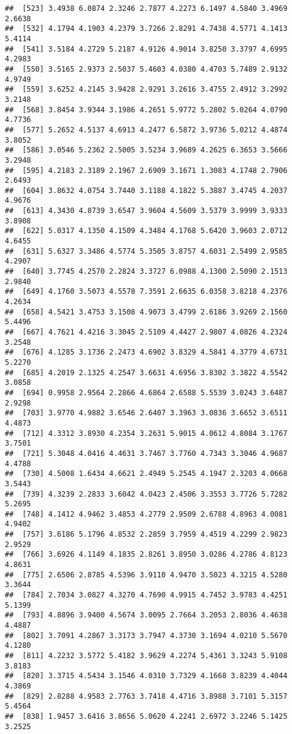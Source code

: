 \documentclass[12pt,a4paper]{scrartcl}\usepackage[]{graphicx}\usepackage[]{color}
\makeatletter
\newenvironment{kframe}{%
 \def\at@end@of@kframe{}%
 \ifinner\ifhmode%
  \def\at@end@of@kframe{\end{minipage}}%
  \begin{minipage}{\columnwidth}%
 \fi\fi%
 \def\FrameCommand##1{\hskip\@totalleftmargin \hskip-\fboxsep
 \colorbox{shadecolor}{##1}\hskip-\fboxsep
     \hskip-\linewidth \hskip-\@totalleftmargin \hskip\columnwidth}%
 \MakeFramed {\advance\hsize-\width
   \@totalleftmargin\z@ \linewidth\hsize
   \@setminipage}}%
 {\par\unskip\endMakeFramed%
 \at@end@of@kframe}
\newenvironment{knitrout}{}{} %
\makeatother
\begin{document}
\begin{Exercise}[difficulty=1, title={Understand the \texttt{<<-}}]
\begin{knitrout}
\begin{kframe}
\begin{verbatim}
##  [523] 3.4938 6.0874 2.3246 2.7877 4.2273 6.1497 4.5840 3.4969 2.6638
##  [532] 4.1794 4.1903 4.2379 3.7266 2.8291 4.7438 4.5771 4.1413 5.4114
##  [541] 3.5184 4.2729 5.2187 4.9126 4.9014 3.8250 3.3797 4.6995 4.2983
##  [550] 3.5165 2.9373 2.5037 5.4603 4.0380 4.4703 5.7489 2.9132 4.9749
##  [559] 3.6252 4.2145 3.9428 2.9291 3.2616 3.4755 2.4912 3.2992 3.2148
##  [568] 3.8454 3.9344 3.1986 4.2651 5.9772 5.2802 5.0264 4.0790 4.7736
##  [577] 5.2652 4.5137 4.6913 4.2477 6.5872 3.9736 5.0212 4.4874 3.8052
##  [586] 3.0546 5.2362 2.5005 3.5234 3.9689 4.2625 6.3653 3.5666 3.2948
##  [595] 4.2183 2.3189 2.1967 2.6909 3.1671 1.3083 4.1748 2.7906 2.6493
##  [604] 3.8632 4.0754 3.7440 3.1188 4.1822 5.3887 3.4745 4.2037 4.9676
##  [613] 4.3430 4.8739 3.6547 3.9604 4.5609 3.5379 3.9999 3.9333 3.8908
##  [622] 5.0317 4.1350 4.1509 4.3484 4.1768 5.6420 3.9603 2.0712 4.6455
##  [631] 5.6327 3.3486 4.5774 5.3505 3.8757 4.6031 2.5499 2.9585 4.2907
##  [640] 3.7745 4.2570 2.2824 3.3727 6.0988 4.1300 2.5090 2.1513 2.9840
##  [649] 4.1760 3.5073 4.5578 7.3591 2.6635 6.0358 3.8218 4.2376 4.2634
##  [658] 4.5421 3.4753 3.1508 4.9073 3.4799 2.6186 3.9269 2.1560 5.4496
##  [667] 4.7621 4.4216 3.3045 2.5109 4.4427 2.9807 4.0826 4.2324 3.2548
##  [676] 4.1285 3.1736 2.2473 4.6902 3.8329 4.5841 4.3779 4.6731 5.2270
##  [685] 4.2019 2.1325 4.2547 3.6631 4.6956 3.8302 3.3822 4.5542 3.0858
##  [694] 0.9958 2.9564 2.2866 4.6864 2.6588 5.5539 3.0243 3.6487 2.9298
##  [703] 3.9770 4.9882 3.6546 2.6407 3.3963 3.0836 3.6652 3.6511 4.4873
##  [712] 4.3312 3.8930 4.2354 3.2631 5.9015 4.0612 4.8084 3.1767 3.7501
##  [721] 5.3048 4.0416 4.4631 3.7467 3.7760 4.7343 3.3046 4.9687 4.4788
##  [730] 4.5008 1.6434 4.6621 2.4949 5.2545 4.1947 2.3203 4.0668 3.5443
##  [739] 4.3239 2.2833 3.6042 4.0423 2.4506 3.3553 3.7726 5.7282 5.2695
##  [748] 4.1412 4.9462 3.4853 4.2779 2.9509 2.6788 4.8963 4.0081 4.9402
##  [757] 3.6186 5.1796 4.8532 2.2859 3.7959 4.4519 4.2299 2.9823 2.9529
##  [766] 3.6926 4.1149 4.1835 2.8261 3.8950 3.0286 4.2786 4.8123 4.8631
##  [775] 2.6506 2.8785 4.5396 3.9110 4.9470 3.5023 4.3215 4.5280 3.3644
##  [784] 2.7034 3.0827 4.3270 4.7690 4.9915 4.7452 3.9783 4.4251 5.1399
##  [793] 4.8896 3.9400 4.5674 3.0095 2.7664 3.2053 2.8036 4.4638 4.4887
##  [802] 3.7091 4.2867 3.3173 3.7947 4.3730 3.1694 4.0210 5.5670 4.1280
##  [811] 4.2232 3.5772 5.4182 3.9629 4.2274 5.4361 3.3243 5.9108 3.8183
##  [820] 3.3715 4.5434 3.1546 4.0310 3.7329 4.1668 3.8239 4.4044 4.3869
##  [829] 2.8288 4.9583 2.7763 3.7418 4.4716 3.8988 3.7101 5.3157 5.4564
##  [838] 1.9457 3.6416 3.8656 5.0620 4.2241 2.6972 3.2246 5.1425 3.2525

\end{verbatim}
\end{kframe}
\end{knitrout}
\end{Exercise}
\end{document}
